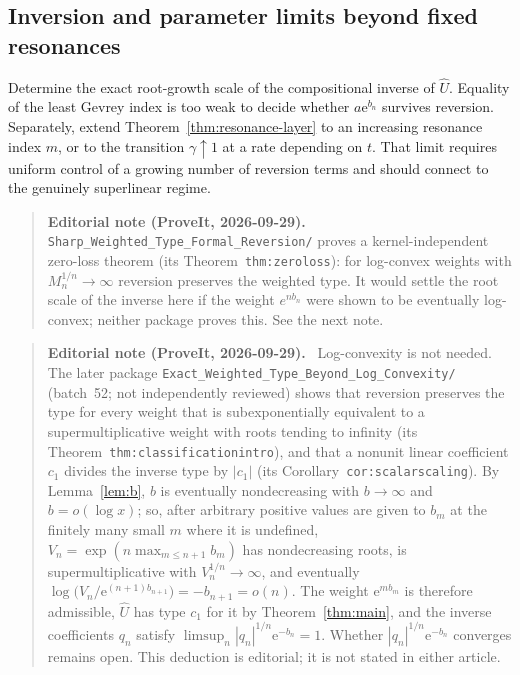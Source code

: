 \documentclass[11pt,a4paper]{article}
\numberwithin{equation}{section}
\theoremstyle{definition}
\theoremstyle{remark}
\newcommand{\Uhat}{\widehat U}
\newcommand{\ee}{\mathrm e}
\newenvironment{ednote}{\par\smallskip\begin{quote}\small\raggedright\textbf{Editorial note (ProveIt, 2026-09-29).}\ }{\end{quote}\smallskip}
\begin{document}
\subsection{Inversion and parameter limits beyond fixed resonances}
Determine the exact root-growth scale of the compositional inverse of
$\Uhat$. Equality of the least Gevrey index is too weak to decide whether
$a\ee^{b_n}$ survives reversion. Separately, extend
Theorem~\ref{thm:resonance-layer} to an increasing resonance index $m$,
or to the transition $\gamma\uparrow1$ at a rate depending on $t$.
That limit requires uniform control of a growing number of reversion
terms and should connect to the genuinely superlinear regime.
\begin{ednote}
\nolinkurl{Sharp_Weighted_Type_Formal_Reversion/} proves a
kernel-independent zero-loss theorem (its Theorem~\texttt{thm:zeroloss}): for
log-convex weights with $M_n^{1/n}\to\infty$ reversion preserves the
weighted type. It would settle the root scale of the inverse here if the
weight $e^{nb_n}$ were shown to be eventually log-convex; neither package
proves this. See the next note.
\end{ednote}
\begin{ednote}
Log-convexity is not needed. The later package
\nolinkurl{Exact_Weighted_Type_Beyond_Log_Convexity/} (batch~52; not
independently reviewed) shows that reversion preserves the type for every
weight that is subexponentially equivalent to a supermultiplicative weight
with roots tending to infinity (its Theorem~\texttt{thm:classificationintro}),
and that a nonunit linear coefficient $c_1$ divides the inverse type by
$|c_1|$ (its Corollary~\texttt{cor:scalarscaling}). By
Lemma~\ref{lem:b}, $b$ is eventually nondecreasing with $b\to\infty$ and
$b=o(\log x)$; so, after arbitrary positive values are given to $b_m$ at the
finitely many small $m$ where it is undefined, $V_n=\exp(n\max_{m\le n+1}b_m)$
has nondecreasing roots, is supermultiplicative with $V_n^{1/n}\to\infty$, and
eventually $\log\bigl(V_n/\ee^{(n+1)b_{n+1}}\bigr)=-b_{n+1}=o(n)$. The weight
$\ee^{mb_m}$ is therefore admissible, $\Uhat$ has type $c_1$ for it by
Theorem~\ref{thm:main}, and the inverse coefficients $q_n$ satisfy
$\limsup_n|q_n|^{1/n}\ee^{-b_n}=1$. Whether $|q_n|^{1/n}\ee^{-b_n}$
converges remains open. This deduction is editorial; it is not stated in
either article.
\end{ednote}
\end{document}
